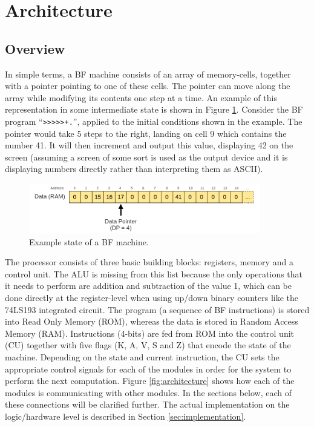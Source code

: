 \section{Architecture} \label{sec:architecture}
\subsection{Overview} \label{sec:architecture:overview}
In simple terms, a BF machine consists of an array of memory-cells, together with a pointer pointing to one of these cells. The pointer can move along the array while modifying its contents one step at a time. An example of this representation in some intermediate state is shown in Figure \ref{fig:simplerepresentation}. Consider the BF program ``\texttt{>>>>>+.}'', applied to the initial conditions shown in the example. The pointer would take 5 steps to the right, landing on cell 9 which contains the number 41. It will then increment and output this value, displaying 42 on the screen (assuming a screen of some sort is used as the output device and it is displaying numbers directly rather than interpreting them as ASCII).

\begin{figure}[H]
  \centering
  \includegraphics[width=0.9\textwidth]{img/simple_representation}
  \caption{Example state of a BF machine.}
  \label{fig:simplerepresentation}
\end{figure}


The processor consists of three basic building blocks: registers, memory and a control unit. The ALU is missing from this list because the only operations that it needs to perform are addition and subtraction of the value 1, which can be done directly at the register-level when using up/down binary counters like the 74LS193 integrated circuit. The program (a sequence of BF instructions) is stored into Read Only Memory (ROM), whereas the data is stored in Random Access Memory (RAM). Instructions (4-bits) are fed from ROM into the control unit (CU) together with five flags (K, A, V, S and Z) that encode the state of the machine. Depending on the state and current instruction, the CU sets the appropriate control signals for each of the modules in order for the system to perform the next computation. Figure \ref{fig:architecture} shows how each of the modules is communicating with other modules. In the sections below, each of these connections will be clarified further. The actual implementation on the logic/hardware level is described in Section \ref{sec:implementation}.

